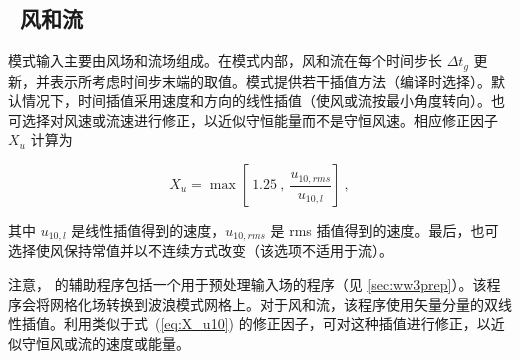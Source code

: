 \vssub
\subsection{~风和流} \label{sub:num_w_c}
\vssub

\noindent
模式输入主要由风场和流场组成。在模式内部，风和流在每个时间步长 $\Delta t_g$ 更新，并表示所考虑时间步末端的取值。模式提供若干插值方法（编译时选择）。默认情况下，时间插值采用速度和方向的线性插值（使风或流按最小角度转向）。也可选择对风速或流速进行修正，以近似守恒能量而不是守恒风速。相应修正因子 $X_u$ 计算为


\begin{equation}
X_u = \max \left [ \: 1.25 \: , \: \frac{u_{10,rms}}{u_{10,l}}
\right ] \: , \label{eq:X_u10} \end{equation}

\noindent
其中 $u_{10,l}$ 是线性插值得到的速度，$u_{10,rms}$ 是 rms 插值得到的速度。最后，也可选择使风保持常值并以不连续方式改变（该选项不适用于流）。

注意，\ws{} 的辅助程序包括一个用于预处理输入场的程序（见 \para\ref{sec:ww3prep}）。该程序会将网格化场转换到波浪模式网格上。对于风和流，该程序使用矢量分量的双线性插值。利用类似于式~(\ref{eq:X_u10}) 的修正因子，可对这种插值进行修正，以近似守恒风或流的速度或能量。
